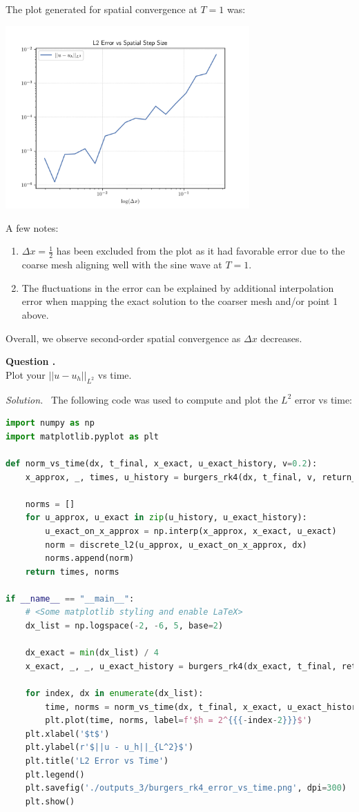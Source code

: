 \documentclass[12pt]{article}
\newcounter{question}
\newcounter{subquest}
\newcommand{\subquestion}{
    \stepcounter{subquest} 
    \vspace{.5em}
    \textbf{\large Question \thequestion.\thesubquest}
    \vspace{.25em}\ \\}
\newcommand{\solution}
    {\par\vspace{0.5em}\noindent\emph{Solution.}\ }
    {\par\vspace{1em}}
\begin{document}
The plot generated for spatial convergence at $T=1$ was:
\begin{center}
\includegraphics[width=0.7\textwidth]{../outputs_3/burgers_rk4_error.png}
\end{center}

A few notes:
\begin{enumerate}
    \item $\Delta x=\frac{1}{2}$ has been excluded from the plot as it had favorable error due to the coarse mesh aligning well with the sine wave at $T=1$.
    \item The fluctuations in the error can be explained by additional interpolation error when mapping the exact solution to the coarser mesh and/or point 1 above.
\end{enumerate}

Overall, we observe second-order spatial convergence as $\Delta x$ decreases.

\subquestion
Plot your $||u-u_h||_{L^2}$ vs time.

\solution
The following code was used to compute and plot the $L^2$ error vs time:
\begin{lstlisting}[language=Python, caption=3.4 Python]
import numpy as np
import matplotlib.pyplot as plt

def norm_vs_time(dx, t_final, x_exact, u_exact_history, v=0.2):
    x_approx, _, times, u_history = burgers_rk4(dx, t_final, v, return_history=True)
    
    norms = []
    for u_approx, u_exact in zip(u_history, u_exact_history):
        u_exact_on_x_approx = np.interp(x_approx, x_exact, u_exact)
        norm = discrete_l2(u_approx, u_exact_on_x_approx, dx)
        norms.append(norm)
    return times, norms

if __name__ == "__main__":
    # <Some matplotlib styling and enable LaTeX>
    dx_list = np.logspace(-2, -6, 5, base=2)

    dx_exact = min(dx_list) / 4
    x_exact, _, _, u_exact_history = burgers_rk4(dx_exact, t_final, return_history=True)

    for index, dx in enumerate(dx_list):
        time, norms = norm_vs_time(dx, t_final, x_exact, u_exact_history)
        plt.plot(time, norms, label=f'$h = 2^{{{-index-2}}}$')
    plt.xlabel('$t$')
    plt.ylabel(r'$||u - u_h||_{L^2}$')
    plt.title('L2 Error vs Time')
    plt.legend()
    plt.savefig('./outputs_3/burgers_rk4_error_vs_time.png', dpi=300)
    plt.show()
\end{lstlisting}
\end{document}
